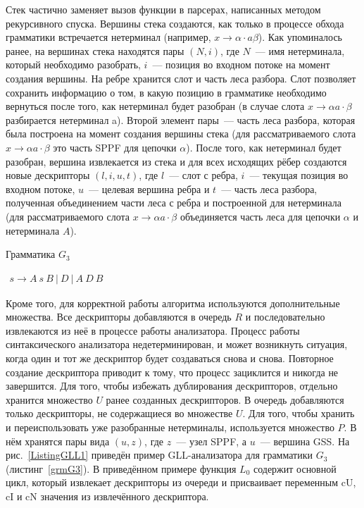Стек частично заменяет вызов функции в парсерах, написанных методом рекурсивного спуска. Вершины стека создаются, как только в процессе обхода грамматики встречается нетерминал (например, $x \rightarrow \alpha \cdot a \beta$). Как упоминалось ранее, на вершинах стека находятся пары $(N, i)$, где $N$~--- имя нетерминала, который необходимо разобрать, $i$~--- позиция во входном потоке на момент создания вершины. На ребре хранится слот и часть леса разбора. Слот позволяет сохранить информацию о том, в какую позицию в грамматике необходимо вернуться после того, как нетерминал будет разобран (в случае слота $x \rightarrow \alpha a \cdot \beta$ разбирается нетерминал a). Второй элемент пары~--- часть леса разбора, которая была построена на момент создания вершины стека (для рассматриваемого слота $x \rightarrow \alpha a \cdot \beta$ это часть SPPF для цепочки $\alpha$). После того, как нетерминал будет разобран, вершина извлекается из стека и для всех исходящих рёбер создаются новые дескрипторы $(l, i, u, t)$, где $l$~--- слот с ребра, $i$~--- текущая позиция во входном потоке, $u$~--- целевая вершина ребра и $t$~--- часть леса разбора, полученная объединением части леса с ребра и построенной для нетерминала (для рассматриваемого слота $x \rightarrow \alpha a \cdot \beta$ объединяется часть леса для цепочки $\alpha$ и нетерминала $A$).

\begin{listing}
\caption{Грамматика $G_3$}
\label{grmG3}
\centering
$\begin{array}{rl}
s \rightarrow A \ s \ B \ | \ D \ | \ A \ D \ B 
\end{array}$
\end{listing}

Кроме того, для корректной работы алгоритма используются дополнительные множества. Все дескрипторы добавляются в очередь $R$ и последовательно извлекаются из неё в процессе работы анализатора. Процесс работы синтаксического анализатора недетерминирован, и может возникнуть ситуация, когда один и тот же дескриптор будет создаваться снова и снова. Повторное создание дескриптора приводит к тому, что процесс зациклится и никогда не завершится. Для того, чтобы избежать дублирования дескрипторов, отдельно хранится множество $U$ ранее созданных дескрипторов. В очередь добавляются только дескрипторы, не содержащиеся во множестве $U$. Для того, чтобы хранить и переиспользовать уже разобранные нетерминалы, используется множество $P$. В нём хранятся пары вида $(u, z)$, где $z$~--- узел SPPF, а $u$~--- вершина GSS. На рис.~\ref{ListingGLL1} приведён пример GLL-анализатора для грамматики $G_3$ (листинг~\ref{grmG3}). В приведённом примере функция $L_0$ содержит основной цикл, который извлекает дескрипторы из очереди и присваивает переменным cU, cI  и cN значения из извлечённого дескриптора. 

